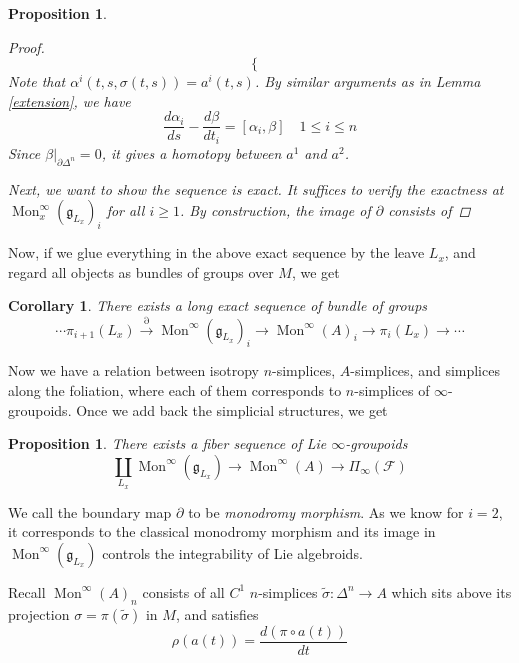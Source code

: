 \documentclass[12pt]{amsart}
\newtheorem{cor}[thm]{Corollary}
\newtheorem{prop}[thm]{Proposition}
\theoremstyle{definition}
\theoremstyle{remark}
\numberwithin{equation}{section}
\newcommand{\del}{\partial}
\renewcommand{\del}{\partial}
\newcommand{\CF}{{\mathcal F}}
\newcommand{\1}{{\mathbb{1}}}
\newcommand{\g}{\mathfrak{g}}
\newcommand{\mon}{\operatorname{Mon}}
\begin{document}
\begin{prop}
\begin{proof}
\begin{equation*}
\begin{cases}
        \end{cases}
    \end{equation*}
    Note that $\alpha^i(t,s, \sigma(t,s)) = a^i(t,s)$. By similar arguments as in Lemma \ref{extension}, we have 
    \begin{equation*}
        \frac{d \alpha_i}{ds} - \frac{d \beta}{dt_{i}} = [\alpha_i, \beta] \quad 1\le i \le n
    \end{equation*}
    Since $\beta|_{\del \Delta^n} = 0$, it gives a homotopy between $a^1$ and $a^2$.
    
    Next, we want to show the sequence is exact. It suffices to verify the exactness at $\mon^{\infty}_x(\g_{L_x})_i$ for all $i \ge 1$. By construction, the image of $\del$ consists of 
\end{proof}

\end{prop}
Now, if we glue everything in the above exact sequence by the leave $L_x$, and regard all objects as bundles of groups over $M$, we get
\begin{cor}
There exists a long exact sequence of bundle of groups
\begin{equation}                                   
    \cdots \pi_{i+1}(L_x) \stackrel{\del}{\to} \mon^{\infty}(\g_{L_x})_i \to \mon^{\infty}(A)_i\to \pi_i(L_x) \to \cdots
\end{equation}
\end{cor}
Now we have a relation between isotropy $n$-simplices, $A$-simplices, and simplices along the foliation, where each of them corresponds to $n$-simplices of $\infty$-groupoids. Once we add back the simplicial structures, we get

\begin{prop}
There exists a fiber sequence of Lie $\infty$-groupoids
\begin{equation}
\coprod_{L_x}\mon^{\infty}(\g_{L_x}) \to \mon^{\infty}(A)\to \Pi_{\infty}(\CF) 
\end{equation}

\end{prop}


 We call the boundary map $\del$ to be {\it monodromy morphism}. As we know for $i=2$, it corresponds to the classical monodromy morphism and its image in $\mon^{\infty}(\g_{L_x})$ controls the integrability of Lie algebroids.


Recall $\mon^{\infty}(A)_{n}$ consists of all $C^1$ $n$-simplices $\tilde{\sigma}: \Delta^n \to A$ which sits above its projection $\sigma= \pi(\tilde{\sigma})$  in $M$, and satisfies
\begin{equation*}
    \rho(a(t)) = \frac{d(\pi\circ a(t))}{dt}
\end{equation*}
\end{document}
